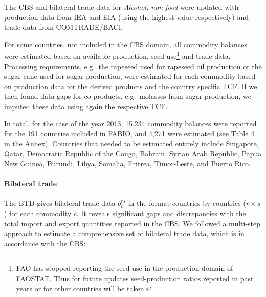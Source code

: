 \documentclass[]{article}
\let\oldparagraph\paragraph
\renewcommand{\paragraph}[1]{\oldparagraph{#1}\mbox{}}
\let\rmarkdownfootnote\footnote%
\def\footnote{\protect\rmarkdownfootnote}
\begin{document}
The CBS and bilateral trade data for \emph{Alcohol, non-food} were
updated with production data from IEA and EIA (using the highest value
respectively) and trade data from COMTRADE/BACI.

For some countries, not included in the CBS domain, all commodity
balances were estimated based on available production, seed
use\footnote{FAO has stopped reporting the seed use in the production
  domain of FAOSTAT. Thus for future updates seed-production ratios
  reported in past years or for other countries will be taken.} and
trade data. Processing requirements, e.g.~the rapeseed used for rapeseed
oil production or the sugar cane used for sugar production, were
estimated for each commodity based on production data for the derived
products and the country specific TCF. If we then found data gaps for
co-products, e.g.~molasses from sugar production, we imputed these data
using again the respective TCF.

In total, for the case of the year 2013, 15,234 commodity balances were
reported for the 191 countries included in FABIO, and 4,271 were
estimated (see Table 4 in the Annex). Countries that needed to be
estimated entirely include Singapore, Qatar, Democratic Republic of the
Congo, Bahrain, Syrian Arab Republic, Papua New Guinea, Burundi, Libya,
Somalia, Eritrea, Timor-Leste, and Puerto Rico.

\paragraph{Bilateral trade}\label{bilateral-trade}

The BTD gives bilateral trade data \(b_{c}^{rs}\) in the format
countries-by-countries (\(r \times s\)) for each commodity \(c\). It
reveals significant gaps and discrepancies with the total import and
export quantities reported in the CBS. We followed a multi-step approach
to estimate a comprehensive set of bilateral trade data, which is in
accordance with the CBS:
\end{document}
